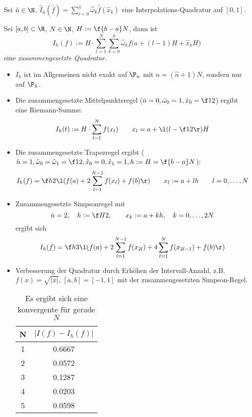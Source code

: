 \documentclass[11pt]{scrartcl}
\begin{document}
\begin{df}
	\label{2.13}
	Sei $\hat n \in \N$, $\hat I_{\hat n}(\hat f) = \sum_{i=0}^{\hat n}\hat \omega_k \hat f(\hat x_k)$ eine Interpolations-Quadratur auf $[0,1]$.

	Sei $[a,b]\subset \R$, $N\in \N$, $H:= \f {b-a}N$, dann ist
	\[
		I_h (f) := H \cdot \sum_{l=1}^N \sum_{k=0}^{\hat n}\hat \omega_k f\Big(a+(l-1)H + \hat x_k H\Big)
	\]
	eine \emph{zusammengesetzte Quadratur}.
\end{df}

\begin{nt*}
	\begin{itemize}
		\item
			$I_h$ ist im Allgemeinen nicht exakt auf $\P_n$ mit $n=(\hat n + 1) N$, sondern nur auf $\P_{\hat n}$.
		\item
			Die zusammengesetzte Mittelpunktsregel ($\hat n = 0, \hat \omega_0 = 1, \hat x_0 = \f 12$) ergibt eine Riemann-Summe:
			\[
				I_h(t) := H \cdot \sum_{l=1}^N f (x_l) \qquad x_l = a + \l(l- \f 12\r) H
			\]
		\item
			Die zusammengesetzte Trapezregel ergibt ($\hat n = 1, \hat \omega_0 = \hat \omega_1 = \f 12, \hat x_0 = 0, \hat x_1 = 1, h := H = \f {b-a}N$):
			\[
				I_h(f) = \f h2 \l(f(a) + 2 \sum_{l=1}^{N-1}f(x_l) + f(b)\r) \qquad x_l := a+ lh \qquad l=0,\dotsc,N
			\]
		\item
			Zusammengesetzte Simpsonregel mit
			\[
				\hat n = 2, \quad h := \f H2, \qquad x_k := a+kh, \quad k=0,\dotsc, 2N
			\]
			ergibt sich
			\[
				I_h(f) = \f h3 \l( f(a) + 2 \sum_{l=1}^{N-1}f(x_{2l}) + 4 \sum_{l=1}^{N}f(x_{2l-1}) + f(b)\r)
			\]
		\item
			Verbesserung der Quadratur durch Erhöhen der Intervall-Anzahl, z.B. $f(x)= \sqrt{|x|}$, $[a,b]=[-1,1]$ mit der zusammengesetzten Simpson-Regel.
			\begin{table}[!ht]
				\centering
				\caption{Es ergibt sich eine konvergente für gerade $N$}
				\begin{tabular}{c|c}
					N & $|I(f)-I_h(f)|$ \\ \hline
					1 & 0.6667 \\
					2 & 0.0572 \\
					3 & 0.1287 \\
					4 & 0.0203 \\
					5 & 0.0598
				\end{tabular}
			\end{table}
	\end{itemize}
\end{nt*}
\end{document}
